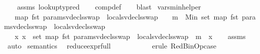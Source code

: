 \begin{isabellebody}
%
\isadelimproof
\ \ %
\endisadelimproof
%
\isatagproof
{}\isamarkupfalse%
\ assms\ lookup{\isacharunderscore}{\kern0pt}ty{\isacharunderscore}{\kern0pt}pred\isanewline
\ \ \isamarkupfalse%
\ comp{\isacharunderscore}{\kern0pt}def\isanewline
\ \ \isamarkupfalse%
\ blast%
\endisatagproof
{\isafoldproof}%
%
\isadelimproof
\isanewline
%
\endisadelimproof
\isanewline
{}\isamarkupfalse%
\ vars{\isacharunderscore}{\kern0pt}min{\isacharunderscore}{\kern0pt}helper{\isacharcolon}{\kern0pt}\isanewline
\ \ \ {\isachardoublequoteopen}map\ fst\ {\isacharparenleft}{\kern0pt}params{\isacharunderscore}{\kern0pt}vdecls{\isacharunderscore}{\kern0pt}swap\ {\isacharat}{\kern0pt}\ locals{\isacharunderscore}{\kern0pt}vdecls{\isacharunderscore}{\kern0pt}swap{\isacharparenright}{\kern0pt}\ {\isasymnoteq}\ {\isacharbrackleft}{\kern0pt}{\isacharbrackright}{\kern0pt}\ {\isasymlongrightarrow}\ m\ {\isasymle}\ Min\ {\isacharparenleft}{\kern0pt}set\ {\isacharparenleft}{\kern0pt}map\ fst\ {\isacharparenleft}{\kern0pt}params{\isacharunderscore}{\kern0pt}vdecls{\isacharunderscore}{\kern0pt}swap\ {\isacharat}{\kern0pt}\ locals{\isacharunderscore}{\kern0pt}vdecls{\isacharunderscore}{\kern0pt}swap{\isacharparenright}{\kern0pt}{\isacharparenright}{\kern0pt}{\isacharparenright}{\kern0pt}{\isachardoublequoteclose}\isanewline
\ \ \ {\isachardoublequoteopen}{\isasymforall}x{\isachardot}{\kern0pt}\ x\ {\isasymin}\ set\ {\isacharparenleft}{\kern0pt}map\ fst\ {\isacharparenleft}{\kern0pt}params{\isacharunderscore}{\kern0pt}vdecls{\isacharunderscore}{\kern0pt}swap\ {\isacharat}{\kern0pt}\ locals{\isacharunderscore}{\kern0pt}vdecls{\isacharunderscore}{\kern0pt}swap{\isacharparenright}{\kern0pt}{\isacharparenright}{\kern0pt}\ {\isasymlongrightarrow}\ m\ {\isasymle}\ x{\isachardoublequoteclose}\isanewline
%
\isadelimproof
\ \ %
\endisadelimproof
%
\isatagproof
{}\isamarkupfalse%
\ assms\isanewline
\ \ \isamarkupfalse%
\ auto%
\endisatagproof
{\isafoldproof}%
%
\isadelimproof
\isanewline
%
\endisadelimproof
\isanewline
\isanewline
{}\isamarkupfalse%
\ semantics\ \isanewline
\isanewline
\isanewline
{}\isamarkupfalse%
\ reduce{\isacharunderscore}{\kern0pt}expr{\isacharunderscore}{\kern0pt}full\ {\isacharequal}{\kern0pt}\ \isanewline
\ \ \ \ \ \ \ \ {\isacharparenleft}{\kern0pt}{\isacharparenleft}{\kern0pt}\ erule\ RedBinOp{\isacharunderscore}{\kern0pt}case\ {\isacharbar}{\kern0pt}\isanewline

\end{isabellebody}
